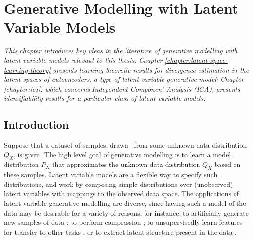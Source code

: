 
\chapter{Generative Modelling with Latent Variable Models}

\ifpdf
    \graphicspath{{Chapter2/Figs/Raster/}{Chapter2/Figs/PDF/}{Chapter2/Figs/}}
\else
    \graphicspath{{Chapter2/Figs/Vector/}{Chapter2/Figs/}}
\fi

\emph{This chapter introduces key ideas in the literature of generative modelling with latent variable models relevant to this thesis:}
\emph{Chapter \ref{chapter:latent-space-learning-theory} presents learning theoretic results for divergence estimation in the latent spaces of autoencoders, a type of latent variable generative model;}
\emph{Chapter \ref{chapter:ica}, which concerns Independent Component Analysis (ICA), presents identifiability results for a particular class of latent variable models.}


\section{Introduction}\label{sec:generative-modelling-tour}

Suppose that a dataset of samples, drawn \iid~from some unknown data distribution $Q_X$, is given.
The high level goal of generative modelling is to learn a model distribution $P_X$ that approximates the unknown data distribution $Q_X$ based on these samples.
Latent variable models are a flexible way to specify such distributions, and work by composing simple distributions over (unobserved) latent variables with mappings to the observed data space.
The applications of latent variable generative modelling are diverse, since
having such a model of the data may be desirable for a variety of reasons, for instance: to artificially generate new samples of data \citep{goodfellow2014generative, oord2016wavenet}; to perform compression \citep{townsend2019practical, townsend2019hilloc}; to unsupervisedly learn features for transfer to other tasks \citep{tschannen2018recent, donahue2019large}; or to extract latent structure present in the data \citep{hyvarinen2000independent}.

